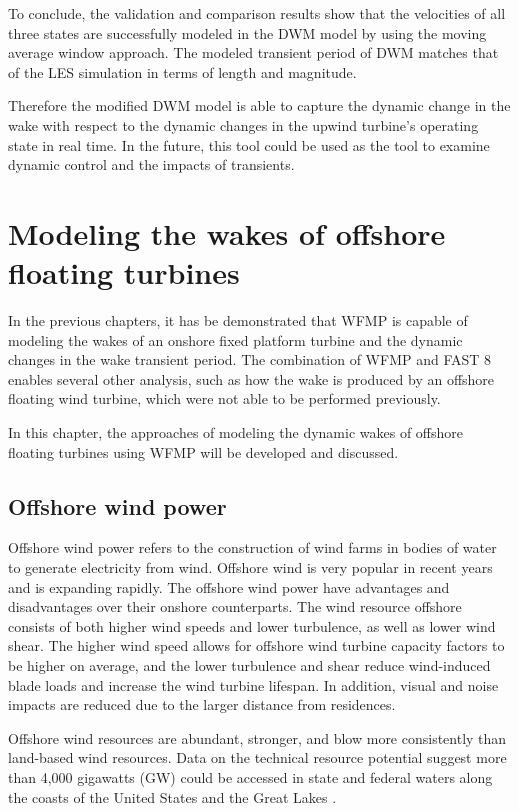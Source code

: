 \documentclass{umthesis}
\begin{document}
To conclude, the validation and comparison results show that the velocities of all three states are successfully modeled in the DWM model by using the moving average window approach. The modeled transient period of DWM matches that of the LES simulation in terms of length and magnitude. 

Therefore the modified DWM model is able to capture the dynamic change in the wake with respect to the dynamic changes in the upwind turbine's operating state in real time. In the future, this tool could be used as the tool to examine dynamic control and the impacts of transients.

\chapter{Modeling the wakes of offshore floating turbines}
In the previous chapters, it has be demonstrated that WFMP is capable of modeling the wakes of an onshore fixed platform turbine and the dynamic changes in the wake transient period. The combination of WFMP and FAST 8 enables several other analysis, such as how the wake is produced by an offshore floating wind turbine, which were not able to be performed previously.

In this chapter, the approaches of modeling the dynamic wakes of offshore floating turbines using WFMP will be developed and discussed.

\section{Offshore wind power}
Offshore wind power refers to the construction of wind farms in bodies of water to generate electricity from wind. Offshore wind is very popular in recent years and is expanding rapidly. The offshore wind power have advantages and disadvantages over their onshore counterparts. The wind resource offshore consists of both higher wind speeds and lower turbulence, as well as lower wind shear. The higher wind speed allows for offshore wind turbine capacity factors to be higher on average, and the lower turbulence and shear reduce wind-induced blade loads and increase the wind turbine lifespan. In addition, visual and noise impacts are reduced due to the larger distance from residences.

Offshore wind resources are abundant, stronger, and blow more consistently than land-based wind resources. Data on the technical resource potential suggest more than 4,000 gigawatts (GW) could be accessed in state and federal waters along the coasts of the United States and the Great Lakes \cite{Schwartz}.
\end{document}
